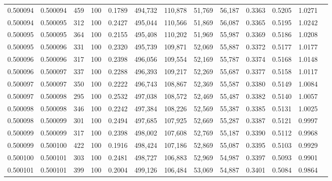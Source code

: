 \begin{tabular}{rrrrrrrrrrrrr}
0.500094 & 0.500094 &   459 & 100 &                                     0.1789 & 494,732 & 110,878 &  51,769 &  56,187 & 0.3363 & 0.5205 & 1.0271 \\
0.500094 & 0.500095 &   312 & 100 &                                     0.2427 & 495,044 & 110,566 &  51,869 &  56,087 & 0.3365 & 0.5195 & 1.0242 \\
0.500095 & 0.500095 &   364 & 100 &                                     0.2155 & 495,408 & 110,202 &  51,969 &  55,987 & 0.3369 & 0.5186 & 1.0208 \\
0.500095 & 0.500096 &   331 & 100 &                                     0.2320 & 495,739 & 109,871 &  52,069 &  55,887 & 0.3372 & 0.5177 & 1.0177 \\
0.500096 & 0.500096 &   317 & 100 &                                     0.2398 & 496,056 & 109,554 &  52,169 &  55,787 & 0.3374 & 0.5168 & 1.0148 \\
0.500096 & 0.500097 &   337 & 100 &                                     0.2288 & 496,393 & 109,217 &  52,269 &  55,687 & 0.3377 & 0.5158 & 1.0117 \\
0.500097 & 0.500097 &   350 & 100 &                                     0.2222 & 496,743 & 108,867 &  52,369 &  55,587 & 0.3380 & 0.5149 & 1.0084 \\
0.500097 & 0.500098 &   295 & 100 &                                     0.2532 & 497,038 & 108,572 &  52,469 &  55,487 & 0.3382 & 0.5140 & 1.0057 \\
0.500098 & 0.500098 &   346 & 100 &                                     0.2242 & 497,384 & 108,226 &  52,569 &  55,387 & 0.3385 & 0.5131 & 1.0025 \\
0.500098 & 0.500099 &   301 & 100 &                                     0.2494 & 497,685 & 107,925 &  52,669 &  55,287 & 0.3387 & 0.5121 & 0.9997 \\
0.500099 & 0.500099 &   317 & 100 &                                     0.2398 & 498,002 & 107,608 &  52,769 &  55,187 & 0.3390 & 0.5112 & 0.9968 \\
0.500099 & 0.500100 &   422 & 100 &                                     0.1916 & 498,424 & 107,186 &  52,869 &  55,087 & 0.3395 & 0.5103 & 0.9929 \\
0.500100 & 0.500101 &   303 & 100 &                                     0.2481 & 498,727 & 106,883 &  52,969 &  54,987 & 0.3397 & 0.5093 & 0.9901 \\
0.500101 & 0.500101 &   399 & 100 &                                     0.2004 & 499,126 & 106,484 &  53,069 &  54,887 & 0.3401 & 0.5084 & 0.9864 \\

\end{tabular}

